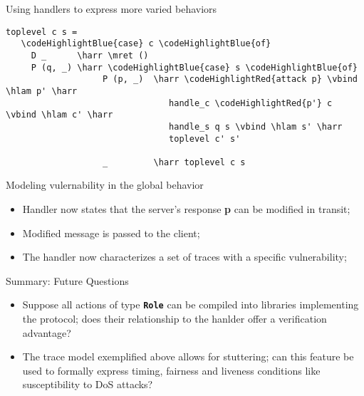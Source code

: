 \documentclass{beamer}
\newcommand\codeHighlightRed[1]{\textcolor[rgb]{1,0,0}{\textbf{#1}}}
\newcommand\codeHighlightBlue[1]{\textcolor[rgb]{0,0,1}{\textbf{#1}}}
\newcommand\codeHighlightGreen[1]{\textcolor[rgb]{0.1,0.7,0.1}{\textbf{#1}}}
\newcommand\codeHighlightViolet[1]{\textcolor[rgb]{0.6, 0, 0.6}{\textbf{#1}}}
\newcommand\codeHighlightOrange[1]{\textcolor[rgb]{0.9, 0.3, 0}{\textbf{#1}}}
\newcommand\vbind[0]{\codeHighlightGreen{>>=}}
\newcommand\mret[0]{\codeHighlightGreen{return}}
\newcommand\hlam[0]{\ensuremath{\backslash}}
\newcommand\harr[0]{\codeHighlightOrange{->}}
\begin{document}
\begin{frame}[fragile]{Using handlers to express more varied behaviors}

 \begin{small}
\begin{Verbatim}[commandchars=\\\{\}]
 toplevel c s =
   \codeHighlightBlue{case} c \codeHighlightBlue{of}
     D _      \harr \mret ()
     P (q, _) \harr \codeHighlightBlue{case} s \codeHighlightBlue{of}
                   P (p, _)  \harr \codeHighlightRed{attack p} \vbind \hlam p' \harr
                                handle_c \codeHighlightRed{p'} c \vbind \hlam c' \harr
                                handle_s q s \vbind \hlam s' \harr
                                toplevel c' s'

                   _         \harr toplevel c s
\end{Verbatim}
\end{small}

\begin{structure}{Modeling vulernability in the global behavior}
 \begin{itemize}
  \item {Handler now states that the server's response \codeHighlightRed{p} can be modified in transit;}
  \item {Modified message is passed to the client;}
  \item {The handler now characterizes a set of traces with a specific vulnerability;}
 \end{itemize}

\end{structure}


\end{frame}

\begin{frame}{Summary: Future Questions}
 \begin{itemize}
  \item {Suppose all actions of type \texttt{\codeHighlightViolet{Role}} can be compiled into libraries implementing
   the protocol; does their relationship to the hanlder offer a verification advantage?}

  \item{The trace model exemplified above allows for stuttering; can this feature be used to
  formally express timing, fairness and liveness conditions like susceptibility to DoS attacks?}
 \end{itemize}

\end{frame}
\end{document}

